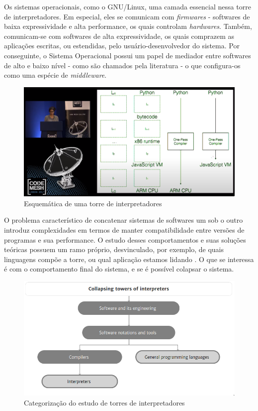 \documentclass[
12pt,				%
openright,			%
oneside,			%
a4paper,			%
english,			%
french,				%
spanish,			%
brazil,				%
]{abntex2}
\begin{document}
Os sistemas operacionais, como o GNU/Linux, uma camada essencial
nessa torre de interpretadores. Em especial, eles se comunicam com
\textit{firmwares} - softwares de baixa expressividade e alta performance, os
quais controlam \textit{hardwares}. Também, comunicam-se com softwares de alta
expressividade, os quais comprazem as aplicações escritas, ou
estendidas, pelo usuário-desenvolvedor do sistema. Por conseguinte, o
Sistema Operacional possui um papel de mediador entre softwares de
alto e baixo nível - como são chamados pela literatura - o que
configura-os como uma espécie de \textit{middleware}.

\begin{figure}[ht]
  \centering
  \caption{\label{fig:tower} Esquemática de uma torre de interpretadores}
  \includegraphics[width=\linewidth]{torres.png}
\end{figure}

O problema característico de concatenar sistemas de softwares um sob o
outro introduz complexidades em termos de manter compatibilidade entre
versões de programas e sua performance. O estudo desses comportamentos
e suas soluções teóricas possuem um ramo próprio, desvinculado, por
exemplo, de quais linguagens compõe a torre, ou qual aplicação estamos
lidando \cite{amin2017towers}. O que se interessa é com o
comportamento final do sistema, e se é possível colapsar o sistema.

\begin{figure}[ht]
  \centering
  \caption{\label{fig:tower2} Categorização do estudo de torres de interpretadores}
  \includegraphics[width=0.5\linewidth]{torres2.png}
\end{figure}
\end{document}
